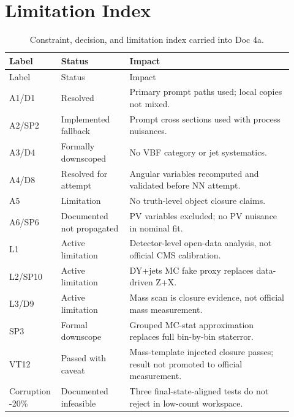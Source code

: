 \documentclass[11pt]{article}
\begin{document}
\section{Limitation Index}
\begin{small}
\begin{longtable}{p{0.14\linewidth}p{0.23\linewidth}p{0.55\linewidth}}
\caption{Constraint, decision, and limitation index carried into Doc 4a.}\label{tab:limitation-index}\\
\toprule
Label & Status & Impact \\
\midrule
\endfirsthead
\toprule
Label & Status & Impact \\
\midrule
\endhead
A1/D1 & Resolved & Primary prompt paths used; local copies not mixed. \\
A2/SP2 & Implemented fallback & Prompt cross sections used with process nuisances. \\
A3/D4 & Formally downscoped & No VBF category or jet systematics. \\
A4/D8 & Resolved for attempt & Angular variables recomputed and validated before NN attempt. \\
A5 & Limitation & No truth-level object closure claims. \\
A6/SP6 & Documented not propagated & PV variables excluded; no PV nuisance in nominal fit. \\
L1 & Active limitation & Detector-level open-data analysis, not official CMS calibration. \\
L2/SP10 & Active limitation & DY+jets MC fake proxy replaces data-driven Z+X. \\
L3/D9 & Active limitation & Mass scan is closure evidence, not official mass measurement. \\
SP3 & Formal downscope & Grouped MC-stat approximation replaces full bin-by-bin staterror. \\
VT12 & Passed with caveat & Mass-template injected closure passes; result not promoted to official measurement. \\
Corruption -20\% & Documented infeasible & Three final-state-aligned tests do not reject in low-count workspace. \\
\bottomrule
\end{longtable}
\end{small}
\end{document}
